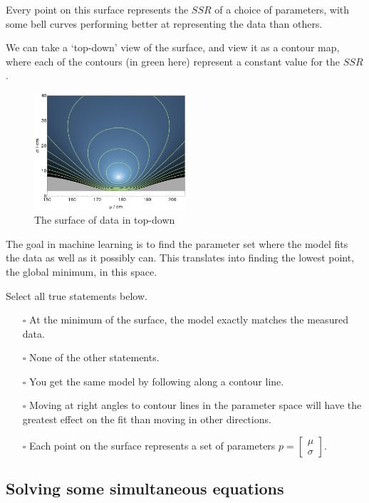 \documentclass[]{article}
\begin{document}
Every point on this surface represents the $ SSR $ of a choice of parameters, with some bell curves performing better at representing the data than others.

We can take a ‘top-down’ view of the surface, and view it as a contour map, where each of the contours (in green here) represent a constant value for the $ SSR $.

\begin{figure}[h]
	\centering
	\includegraphics[width=0.5\textwidth]{quiz5_b}
	\caption{The surface of data in top-down}
	\label{fig:quiz5_b}
\end{figure}

The goal in machine learning is to find the parameter set where the model fits the data as well as it possibly can. This translates into finding the lowest point, the global minimum, in this space.

Select all true statements below.

\begin{itemize}
	\item[$\square$] At the minimum of the surface, the model exactly matches the measured data.
	\item[$\square$] None of the other statements.
	\item[$\square$] You get the same model by following along a contour line.
	\item[$\square$] Moving at right angles to contour lines in the parameter space will have the greatest effect on the fit than moving in other directions.
	\item[$\square$] Each point on the surface represents a set of parameters $ p = \begin{bmatrix}
		\mu \\
		\sigma
	\end{bmatrix}$.
\end{itemize}

\subsection{Solving some simultaneous equations}
\end{document}
